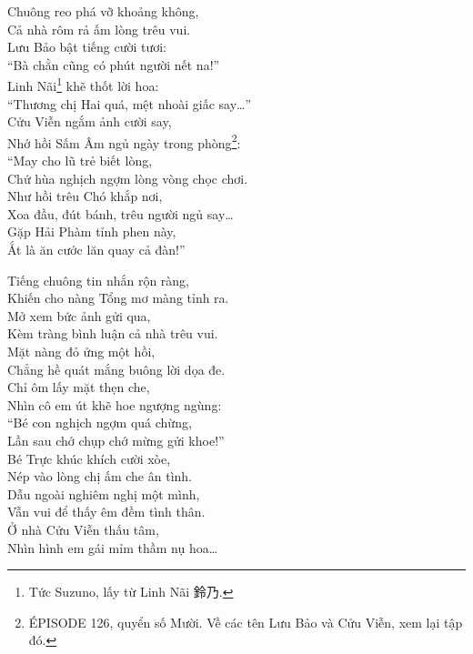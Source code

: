 \documentclass[../main.tex]{subfiles}
\begin{document}
\begin{center}
    Chuông reo phá vỡ khoảng không,\\
    Cả nhà rôm rả ấm lòng trêu vui.\\
    Lưu Bảo bật tiếng cười tươi:\\
    ``Bà chằn cũng có phút người nết na!''\\
    Linh Nãi\footnote{Tức Suzuno, lấy từ Linh Nãi 鈴乃.} khẽ thốt lời hoa:\\
    ``Thương chị Hai quá, mệt nhoài giấc say\dots''\\
    Cửu Viễn ngắm ảnh cười say,\\
    Nhớ hồi Sấm Âm ngủ ngày trong phòng\footnote{{\flaregothic ÉPISODE 126}, quyển số Mười. Về các tên Lưu Bảo và Cửu Viễn, xem lại tập đó.}:\\
    ``May cho lũ trẻ biết lòng,\\
    Chứ hùa nghịch ngợm lòng vòng chọc chơi.\\
    Như hồi trêu Chó khắp nơi,\\
    Xoa đầu, đút bánh, trêu người ngủ say\dots\\
    Gặp Hải Phàm tỉnh phen này,\\
    Ắt là ăn cước lăn quay cả đàn!''

    Tiếng chuông tin nhắn rộn ràng,\\
    Khiến cho nàng Tổng mơ màng tỉnh ra.\\
    Mở xem bức ảnh gửi qua,\\
    Kèm tràng bình luận cả nhà trêu vui.\\
    Mặt nàng đỏ ửng một hồi,\\
    Chẳng hề quát mắng buông lời dọa đe.\\
    Chỉ ôm lấy mặt thẹn che,\\
    Nhìn cô em út khẽ hoe ngượng ngùng:\\
    ``Bé con nghịch ngợm quá chừng,\\
    Lần sau chớ chụp chớ mừng gửi khoe!''\\
    Bé Trực khúc khích cười xòe,\\
    Nép vào lòng chị ấm che ân tình.\\
    Dẫu ngoài nghiêm nghị một mình,\\
    Vẫn vui để thấy êm đềm tình thân.\\
    Ở nhà Cửu Viễn thấu tâm,\\
    Nhìn hình em gái mỉm thầm nụ hoa\dots
\end{center}
\end{document}
